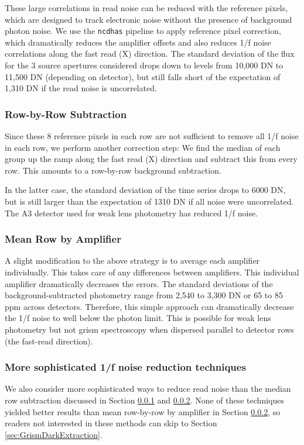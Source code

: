 \documentclass[]{aastex62}
\begin{document}
These large correlations in read noise can be reduced with the reference pixels, which are designed to track electronic noise without the presence of background photon noise.
We use the \texttt{ncdhas} pipeline to apply reference pixel correction, which dramatically reduces the amplifier offsets and also reduces 1/f noise correlations along the fast read (X) direction.
The standard deviation of the flux for the 3 source apertures considered drops down to levels from 10,000 DN to 11,500 DN (depending on detector), but still falls short of the expectation of 1,310 DN if the read noise is uncorrelated.

\subsubsection{Row-by-Row Subtraction}\label{sec:photRowByRow}

Since these 8 reference pixels in each row are not sufficient to remove all 1/f noise in each row, we perform another correction step:
We find the median of each group up the ramp along the fast read (X) direction and subtract this from every row.
This amounts to a row-by-row background subtraction.

In the latter case, the standard deviation of the time series drops to 6000 DN, but is still larger than the expectation of 1310 DN if all noise were uncorrelated.
The A3 detector used for weak lens photometry has reduced 1/f noise.

\subsubsection{Mean Row by Amplifier}\label{sec:indAmpAvg}
A slight modification to the above strategy is to average each amplifier individually.
This takes care of any differences between amplifiers.
This individual amplifier dramatically decreases the errors.
The standard deviations of the background-subtracted photometry range from 2,540 to 3,300 DN or 65 to 85 ppm across detectors.
Therefore, this simple approach can dramatically decrease the 1/f noise to well below the photon limit.
This is possible for weak lens photometry but not grism spectroscopy when dispersed parallel to detector rows (the fast-read direction).

\subsubsection{More sophisticated 1/f noise reduction techniques}
We also consider more sophisticated ways to reduce read noise than the median row subtraction discussed in Section \ref{sec:photRowByRow} and \ref{sec:indAmpAvg}.
None of these techniques yielded better results than mean row-by-row by amplifier in Section \ref{sec:indAmpAvg}, so readers not interested in these methods can skip to Section \ref{sec:GrismDarkExtraction}.
\end{document}
